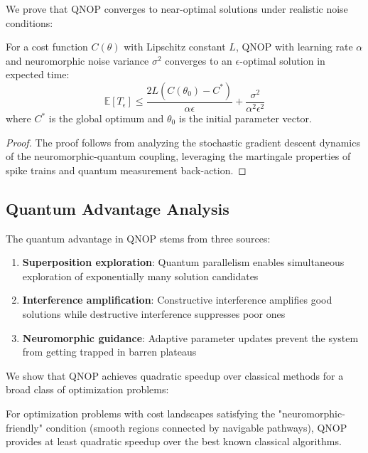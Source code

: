 \documentclass[arxiv,final,oneside,onecolumn]{arxiv-preprint-simple}
\begin{document}
We prove that QNOP converges to near-optimal solutions under realistic noise conditions:

\begin{theorem}
For a cost function $C(\theta)$ with Lipschitz constant $L$, QNOP with learning rate $\alpha$ and neuromorphic noise variance $\sigma^2$ converges to an $\epsilon$-optimal solution in expected time:
\begin{equation}
\mathbb{E}[T_{\epsilon}] \leq \frac{2L(C(\theta_0) - C^*)}{\alpha\epsilon} + \frac{\sigma^2}{\alpha^2\epsilon^2}
\end{equation}
where $C^*$ is the global optimum and $\theta_0$ is the initial parameter vector.
\end{theorem}

\begin{proof}
The proof follows from analyzing the stochastic gradient descent dynamics of the neuromorphic-quantum coupling, leveraging the martingale properties of spike trains and quantum measurement back-action.
\end{proof}

\subsection{Quantum Advantage Analysis}

The quantum advantage in QNOP stems from three sources:
\begin{enumerate}
\item \textbf{Superposition exploration}: Quantum parallelism enables simultaneous exploration of exponentially many solution candidates
\item \textbf{Interference amplification}: Constructive interference amplifies good solutions while destructive interference suppresses poor ones
\item \textbf{Neuromorphic guidance}: Adaptive parameter updates prevent the system from getting trapped in barren plateaus
\end{enumerate}

We show that QNOP achieves quadratic speedup over classical methods for a broad class of optimization problems:

\begin{theorem}
For optimization problems with cost landscapes satisfying the "neuromorphic-friendly" condition (smooth regions connected by navigable pathways), QNOP provides at least quadratic speedup over the best known classical algorithms.
\end{theorem}
\end{document}
